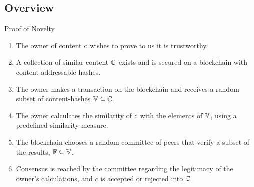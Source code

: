 \documentclass{beamer}
\begin{document}
\subsection{Overview}
\begin{frame}[b]{Proof of Novelty}
    \begin{enumerate}
        \item<only@1>[1] The owner of content ${c}$ wishes to prove to us it is trustworthy.
        \item<only@1>[2] A collection of similar content ${{\mathbb{C}}}$ exists and is secured on a blockchain with content-addressable hashes.
        \item<only@2>[3] The owner makes a transaction on the blockchain and receives a random subset of content-hashes ${\mathbb{V}} \subseteq {{\mathbb{C}}}$.
        \item<only@2>[4] The owner calculates the similarity of ${c}$ with the elements of ${\mathbb{V}}$, using a predefined similarity measure.
        \item<only@3>[5] The blockchain chooses a random committee of peers that verify a subset of the results, ${\mathbb{F}} \subseteq {\mathbb{V}}$.
        \item<only@4>[6] Consensus is reached by the committee regarding the legitimacy of the owner's calculations, and $c$ is accepted or rejected into ${{\mathbb{C}}}$.
    \end{enumerate}
    \begin{figure}[b!]

\end{figure}
\end{frame}
\end{document}
